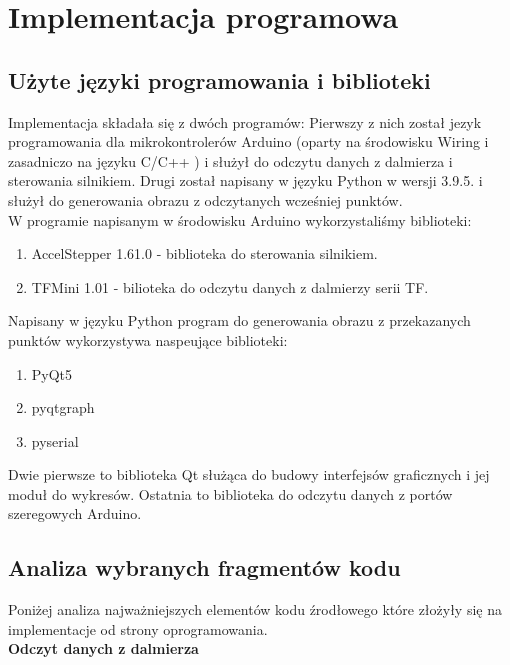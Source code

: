 \section {Implementacja programowa}

\subsection {Użyte języki programowania i biblioteki}
Implementacja składała się z dwóch programów: Pierwszy z nich został jezyk programowania dla mikrokontrolerów Arduino (oparty na środowisku Wiring i zasadniczo na języku C/C++ \cite{arduino}) i służył do odczytu danych z dalmierza i sterowania silnikiem. Drugi został napisany w języku Python w wersji 3.9.5. i służył do generowania obrazu z odczytanych wcześniej punktów.\\

W programie napisanym w środowisku Arduino wykorzystaliśmy biblioteki:

\begin{enumerate}
    \item AccelStepper 1.61.0 - biblioteka do sterowania silnikiem.
    \item TFMini 1.01 - bilioteka do odczytu danych z dalmierzy serii TF.
\end{enumerate}

Napisany w języku Python program do generowania obrazu z przekazanych punktów wykorzystywa naspeujące biblioteki:

\begin{enumerate}
    \item PyQt5
    \item pyqtgraph
    \item pyserial
\end{enumerate}

Dwie pierwsze to biblioteka Qt służąca do budowy interfejsów graficznych i jej moduł do wykresów. Ostatnia to biblioteka do odczytu danych z portów szeregowych Arduino.

\subsection {Analiza wybranych fragmentów kodu}

Poniżej analiza najważniejszych elementów kodu źrodłowego które złożyły się na implementacje od strony oprogramowania.\\

\textbf{Odczyt danych z dalmierza}

